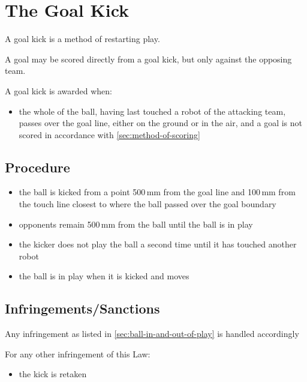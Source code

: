 \section{The Goal Kick}\label{sec:goal-kick}

A goal kick is a method of restarting play.

A goal may be scored directly from a goal kick, but only against the opposing team.

A goal kick is awarded when:

\begin{itemize}
\item the whole of the ball, having last touched a robot of the attacking team, passes over the goal line, either on the ground or in the air, and a goal is not scored in accordance with \autoref{sec:method-of-scoring}
\end{itemize}

\subsection{Procedure}
\begin{itemize}
\item the ball is kicked from a point 500\,mm from the goal line and 100\,mm from the touch line closest to where the ball passed over the goal boundary
\item opponents remain 500\,mm from the ball until the ball is in play
\item the kicker does not play the ball a second time until it has touched another robot
\item the ball is in play when it is kicked and moves
\end{itemize}

\subsection{Infringements/Sanctions}
Any infringement as listed in \autoref{sec:ball-in-and-out-of-play} is handled accordingly

For any other infringement of this Law:
\begin{itemize}
\item the kick is retaken
\end{itemize}
